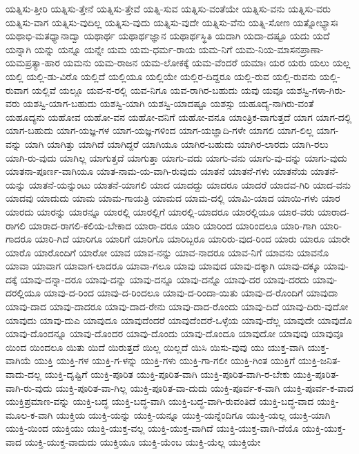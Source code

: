 {ಯತ್ನಿಸು-ತ್ತೀರಿ
ಯತ್ನಿಸು-ತ್ತೇನೆ
ಯತ್ನಿಸು-ತ್ತೇವೆ
ಯತ್ನಿ-ಸುವ
ಯತ್ನಿಸು-ವಂತೆಯೇ
ಯತ್ನಿಸು-ವನು
ಯತ್ನಿಸು-ವರು
ಯತ್ನಿಸು-ವಾಗ
ಯತ್ನಿಸು-ವುದಿಲ್ಲ
ಯತ್ನಿಸು-ವುದು
ಯತ್ನಿಸು-ವುದೇ
ಯತ್ನಿಸು-ವೆನು
ಯತ್ನಿ-ಸೋಣ
ಯತ್ನೋಭ್ಯಾಸಃ
ಯಥಾಭಿ-ಮತಧ್ಯಾನಾದ್ವಾ
ಯಥಾರ್ಥ
ಯಥಾರ್ಥಜ್ಞಾನ
ಯಥಾರ್ಥಸ್ಥಿತಿ
ಯದಾಗಿ
ಯದಾ-ದಷ್ಟೂ
ಯದು
ಯದೆ
ಯನ್ನಾಗಿ
ಯನ್ನು
ಯನ್ನೂ
ಯನ್ನೇ
ಯಮ
ಯಮ-ಧರ್ಮ-ರಾಯ
ಯಮ-ನಿಗೆ
ಯಮ-ನಿಯ-ಮಾಸನಪ್ರಾಣಾ-ಯಮಪ್ರತ್ಯಾ-ಹಾರ
ಯಮನು
ಯಮ-ರಾಜನ
ಯಮ-ಲೋಕಕ್ಕೆ
ಯಮ-ವೆಂದರೆ
ಯಮಾಃ
ಯರ
ಯರು
ಯಲು
ಯಲ್ಲ
ಯಲ್ಲಿ
ಯಲ್ಲಿ-ಡು-ವಿರೊ
ಯಲ್ಲಿದೆ
ಯಲ್ಲಿಯೂ
ಯಲ್ಲಿಯೇ
ಯಲ್ಲಿರ-ದಿದ್ದರೂ
ಯಲ್ಲಿ-ರುವ
ಯಲ್ಲಿ-ರುವನು
ಯಲ್ಲಿ-ರುವಾಗ
ಯಲ್ಲಿವೆ
ಯಲ್ಲೂ
ಯವ-ನ-ರಲ್ಲಿ
ಯವ-ನಿಗೂ
ಯವ-ರಾಗಿರ-ಬಹುದು
ಯವು
ಯವೂ
ಯಶಸ್ವಿ-ಗಳಾ-ಗಿರು-ವರು
ಯಶಸ್ವಿ-ಯಾಗ-ಬಹುದು
ಯಶಸ್ವಿ-ಯಾಗಿ
ಯಶಸ್ವಿ-ಯಾದಷ್ಟೂ
ಯಶಸ್ಸು
ಯಹೂದ್ಯ-ನಾಗಿರು-ವಂತೆ
ಯಹೂದ್ಯನು
ಯಹೋವ
ಯಹೋ-ವನ
ಯಹೋ-ವನಿಗೆ
ಯಹೋ-ವನೂ
ಯಾಂತ್ರಿಕ-ವಾಗುತ್ತದೆ
ಯಾಗ
ಯಾಗ-ದಲ್ಲಿ
ಯಾಗ-ಬಹುದು
ಯಾಗ-ಯಜ್ಞ-ಗಳ
ಯಾಗ-ಯಜ್ಞ-ಗಳಿಂದ
ಯಾಗ-ಯಜ್ಞಾದಿ-ಗಳೇ
ಯಾಗಲಿ
ಯಾಗ-ಲಿಲ್ಲ
ಯಾಗ-ವನ್ನು
ಯಾಗಿ
ಯಾಗಿತ್ತು
ಯಾಗಿದೆ
ಯಾಗಿದ್ದರೆ
ಯಾಗಿಯೂ
ಯಾಗಿರ-ಬಹುದು
ಯಾಗಿರ-ಲಾರದು
ಯಾಗಿ-ರಲು
ಯಾಗಿ-ರು-ವುದು
ಯಾಗಿಲ್ಲ
ಯಾಗುತ್ತದೆ
ಯಾಗುತ್ತಾ
ಯಾಗು-ವದು
ಯಾಗು-ವನು
ಯಾಗು-ವು-ದನ್ನು
ಯಾಗು-ವುದು
ಯಾತನಾ-ಪೂರ್ಣ-ವಾಗಿಯೂ
ಯಾತ-ನಾಮ-ಯ-ವಾಗಿ-ರುವುದು
ಯಾತನೆ
ಯಾತನೆ-ಗಳು
ಯಾತನೆಯ
ಯಾತನೆ-ಯನ್ನು
ಯಾತನೆ-ಯನ್ನುಂಟು
ಯಾತನೆ-ಯಾಗಲಿ
ಯಾದ
ಯಾದದ್ದು
ಯಾದರೂ
ಯಾದರೆ
ಯಾದವ-ಗಿರಿ
ಯಾದ-ವನು
ಯಾದವು
ಯಾದುದು
ಯಾಮ
ಯಾಮ-ಗಾಯತ್ರಿ
ಯಾಮದ
ಯಾಮ-ದಲ್ಲಿ
ಯಾಮಿ-ಯಾದ
ಯಾಯಿ-ಗಳು
ಯಾರ
ಯಾರದು
ಯಾರನ್ನು
ಯಾರನ್ನೂ
ಯಾರಲ್ಲಿ
ಯಾರಲ್ಲಿಗೆ
ಯಾರಲ್ಲಿ-ಯಾದರೂ
ಯಾರಲ್ಲಿಯೂ
ಯಾರ-ವರು
ಯಾರಾದ-ರಾಗಲಿ
ಯಾರಾದ-ರಾಗಲಿ-ಕಲಿಯ-ಬೇಕಾದ
ಯಾರಾ-ದರೂ
ಯಾರಿ
ಯಾರಿಂದ
ಯಾರಿಂದಲೂ
ಯಾರಿ-ಗಾಗಿ
ಯಾರಿ-ಗಾದರೂ
ಯಾರಿ-ಗಿದೆ
ಯಾರಿಗೂ
ಯಾರಿಗೆ
ಯಾರಿಗೊ
ಯಾರಿಬ್ಬರೂ
ಯಾರಿರು-ವುದ-ರಿಂದ
ಯಾರು
ಯಾರೂ
ಯಾರೇ
ಯಾರೊ
ಯಾರೊಂದಿಗೆ
ಯಾರೋ
ಯಾವ
ಯಾವ-ನನ್ನು
ಯಾವ-ನಾದರೂ
ಯಾವ-ನಿಗೆ
ಯಾವನು
ಯಾವನೊ
ಯಾವಾ
ಯಾವಾಗ
ಯಾವಾಗ-ಲಾದರೂ
ಯಾವಾ-ಗಲೂ
ಯಾವು
ಯಾವುದ
ಯಾವು-ದಕ್ಕಾಗಿ
ಯಾವು-ದಕ್ಕೂ
ಯಾವು-ದಕ್ಕೆ
ಯಾವು-ದನ್ನಾ-ದರೂ
ಯಾವು-ದನ್ನು
ಯಾವು-ದನ್ನೂ
ಯಾವು-ದನ್ನೊ
ಯಾವು-ದರ
ಯಾವು-ದರದು
ಯಾವು-ದರಲ್ಲಿಯೂ
ಯಾವು-ದ-ರಿಂದ
ಯಾವು-ದ-ರಿಂದಲೂ
ಯಾವು-ದ-ರಿಂದಾ-ಯಿತು
ಯಾವು-ದ-ರೊಂದಿಗೆ
ಯಾವುದಾ
ಯಾವು-ದಾದ
ಯಾವು-ದಾದರೂ
ಯಾವು-ದಾದ-ರೇನು
ಯಾವು-ದಾದ-ರೊಂದು
ಯಾವು-ದಿದೆ
ಯಾವು-ದಿರು-ವುದೋ
ಯಾವುದು
ಯಾವು-ದುಎ
ಯಾವುದೂ
ಯಾವುದೆಂದರೆ
ಯಾವುದೆಂದರೆ-ಒಳ್ಳೆಯ
ಯಾವು-ದೆಲ್ಲ
ಯಾವುದೇ
ಯಾವುದೊ
ಯಾವು-ದೊಂದನ್ನೂ
ಯಾವು-ದೊಂದರ
ಯಾವು-ದೊಂದು
ಯಾವು-ದೊಂದೂ
ಯಾವುದೋ
ಯಾವುವು
ಯಾವುವೂ
ಯಿಂದ
ಯಿಂದಲೂ
ಯಿತು
ಯಿದೆ
ಯಿರುತ್ತದೆ
ಯಿಲ್ಲ
ಯಿಲ್ಲದೆ
ಯಿಸಿ
ಯಿಸು-ವುವು
ಯು
ಯುಕ್ತ-ವಾಗಿ
ಯುಕ್ತ-ವಾಗಿಯೆ
ಯುಕ್ತಿ
ಯುಕ್ತಿ-ಗಳ
ಯುಕ್ತಿ-ಗ-ಳನ್ನು
ಯುಕ್ತಿ-ಗಳು
ಯುಕ್ತಿ-ಗಾ-ಗಲೀ
ಯುಕ್ತಿ-ಗಿಂತ
ಯುಕ್ತಿಗೆ
ಯುಕ್ತಿ-ಜನಿತ-ವಾದು-ದಲ್ಲ
ಯುಕ್ತಿ-ದೃಷ್ಟಿಗೆ
ಯುಕ್ತಿ-ಪೂರಿತ
ಯುಕ್ತಿ-ಪೂರಿತ-ವಾಗಿ
ಯುಕ್ತಿ-ಪೂರಿತ-ವಾಗಿ-ರ-ಬೇಕು
ಯುಕ್ತಿ-ಪೂರಿತ-ವಾಗಿ-ರು-ವುದು
ಯುಕ್ತಿ-ಪೂರಿತ-ವಾ-ಗಿಲ್ಲ
ಯುಕ್ತಿ-ಪೂರಿತ-ವಾ-ದುದು
ಯುಕ್ತಿ-ಪೂರ್ವ-ಕ-ವಾಗಿ
ಯುಕ್ತಿ-ಪೂರ್ವ-ಕ-ವಾದ
ಯುಕ್ತಿಪ್ರಮಾಣ-ವನ್ನು
ಯುಕ್ತಿ-ಬದ್ಧ
ಯುಕ್ತಿ-ಬದ್ಧ-ವಾಗಿ
ಯುಕ್ತಿ-ಬದ್ಧ-ವಾಗಿ-ರುವಂತಿದೆ
ಯುಕ್ತಿ-ಬದ್ಧ-ವಾದ
ಯುಕ್ತಿ-ಮೂಲ-ಕ-ವಾಗಿ
ಯುಕ್ತಿಯ
ಯುಕ್ತಿ-ಯನ್ನು
ಯುಕ್ತಿ-ಯನ್ನೂ
ಯುಕ್ತಿ-ಯನ್ನೆಂದಿಗೂ
ಯುಕ್ತಿ-ಯಲ್ಲ
ಯುಕ್ತಿ-ಯಾಗಿ
ಯುಕ್ತಿ-ಯಿಂದ
ಯುಕ್ತಿಯು
ಯುಕ್ತಿ-ಯುಕ್ತ-ವಲ್ಲ
ಯುಕ್ತಿ-ಯುಕ್ತ-ವಾಗಿದೆ
ಯುಕ್ತಿ-ಯುಕ್ತ-ವಾಗಿ-ದೆಯೊ
ಯುಕ್ತಿ-ಯುಕ್ತ-ವಾದ
ಯುಕ್ತಿ-ಯುಕ್ತ-ವಾದುದು
ಯುಕ್ತಿಯೂ
ಯುಕ್ತಿ-ಯೆಂಬ
ಯುಕ್ತಿ-ಯೆಲ್ಲ
ಯುಕ್ತಿಯೇ
}
